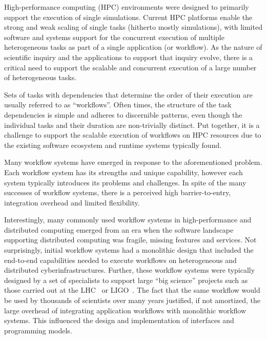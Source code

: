 
High-performance computing (HPC) environments were designed to primarily
support the execution of single simulations. Current HPC platforms enable the
strong and weak scaling of single tasks (hitherto mostly simulations), with
limited software and systems support for the concurrent execution of multiple
heterogeneous tasks as part of a single application (or workflow). As the
nature of scientific inquiry and the applications to support that inquiry
evolve, there is a critical need to support the scalable and concurrent
execution of a large number of heterogeneous tasks.


Sets of tasks with dependencies that determine the order of their execution
are usually referred to as ``workflows''. Often times, the structure of the
task dependencies is simple and adheres to discernible patterns, even though
the individual tasks and their duration are non-trivially distinct. Put
together, it is a challenge to support the scalable execution of workflows on
HPC resources due to the existing software ecosystem and runtime systems
typically found.

Many workflow systems have emerged in response to the aforementioned problem.
Each workflow system has its strengths and unique capability, however each
system typically introduces its problems and challenges. In spite of the many
successes of workflow systems, there is a perceived high barrier-to-entry,
integration overhead and limited flexibility.

Interestingly, many commonly used workflow systems in high-performance and
distributed computing emerged from an era when the software landscape
supporting distributed computing was fragile, missing features and services.
Not surprisingly, initial workflow systems had a monolithic design that
included the end-to-end capabilities needed to execute workflows on
heterogeneous and distributed cyberinfrastructures. Further, these workflow
systems were typically designed by a set of specialists to support large
``big science'' projects such as those carried out at the
LHC~\cite{breskin2009cern} or LIGO~\cite{althouse1992ligo}. The fact that the
same workflow would be used by thousands of scientists over many years
justified, if not amortized, the large overhead of integrating application
workflows with monolithic workflow systems. This influenced the design and
implementation of %
interfaces and programming models.

